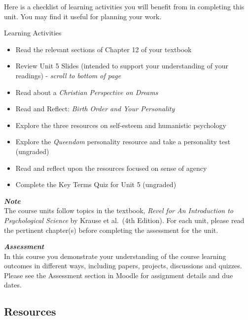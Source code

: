 \documentclass[
]{book}
\providecommand{\tightlist}{%
  \setlength{\itemsep}{0pt}\setlength{\parskip}{0pt}}
\begin{document}
Here is a checklist of learning activities you will benefit from in completing this unit. You may find it useful for planning your work.

\begin{reflect}
{Learning Activities}

\begin{itemize}
\tightlist
\item
  Read the relevant sections of Chapter 12 of your textbook
\item
  Review Unit 5 Slides (intended to support your understanding of your readings) - \emph{scroll to bottom of page}
\item
  Read about a \emph{Christian Perspective on Dreams}
\item
  Read and Reflect: \emph{Birth Order and Your Personality}
\item
  Explore the three resources on self-esteem and humanistic psychology
\item
  Explore the \emph{Queendom} personality resource and take a personality test (ungraded)
\item
  Read and reflect upon the resources focused on sense of agency
\item
  Complete the Key Terms Quiz for Unit 5 (ungraded)
\end{itemize}
\end{reflect}

\begin{caution}
\textbf{\emph{Note}}\\
The course units follow topics in the textbook, \emph{Revel for An Introduction to Psychological Science} by Krause et al.~(4th Edition). For each unit, please read the pertinent chapter(s) before completing the assessment for the unit.
\end{caution}

\begin{assessment}
\textbf{\emph{Assessment}}\\
In this course you demonstrate your understanding of the course learning outcomes in different ways, including papers, projects, discussions and quizzes. Please see the Assessment section in Moodle for assignment details and due dates.
\end{assessment}

\hypertarget{resources-4}{%
\subsection*{Resources}\label{resources-4}}
\end{document}
